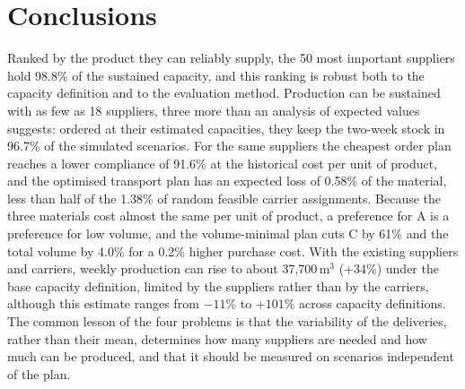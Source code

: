 \documentclass[11pt,a4paper]{article}
\begin{document}
\section{Conclusions}
Ranked by the product they can reliably supply, the 50 most important suppliers hold 98.8\% of the sustained capacity, and this ranking is robust both to the capacity definition and to the evaluation method.
Production can be sustained with as few as 18 suppliers, three more than an analysis of expected values suggests: ordered at their estimated capacities, they keep the two-week stock in 96.7\% of the simulated scenarios.
For the same suppliers the cheapest order plan reaches a lower compliance of 91.6\% at the historical cost per unit of product, and the optimised transport plan has an expected loss of 0.58\% of the material, less than half of the 1.38\% of random feasible carrier assignments.
Because the three materials cost almost the same per unit of product, a preference for A is a preference for low volume, and the volume-minimal plan cuts C by 61\% and the total volume by 4.0\% for a 0.2\% higher purchase cost.
With the existing suppliers and carriers, weekly production can rise to about 37{,}700\,m$^3$ (+34\%) under the base capacity definition, limited by the suppliers rather than by the carriers, although this estimate ranges from $-11\%$ to $+101\%$ across capacity definitions.
The common lesson of the four problems is that the variability of the deliveries, rather than their mean, determines how many suppliers are needed and how much can be produced, and that it should be measured on scenarios independent of the plan.
\end{document}
